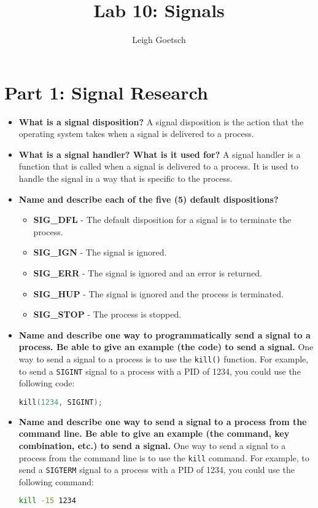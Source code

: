 \documentclass{assignment}
\author{Leigh Goetsch}
\title{Lab 10: Signals}
\begin{document}
\maketitle

\newpage


\section{Part 1: Signal Research}

\begin{itemize}
    \item \textbf{What is a signal disposition?} A signal disposition is the action that the operating system takes when a signal is delivered to a process.
    \item \textbf{What is a signal handler? What is it used for?} A signal handler is a function that is called when a signal is delivered to a process. It is used to handle the signal in a way that is specific to the process.
    \item \textbf{Name and describe each of the five (5) default dispositions?}
    \begin{itemize}
        \item \textbf{SIG\_DFL} - The default disposition for a signal is to terminate the process.
        \item \textbf{SIG\_IGN} - The signal is ignored.
        \item \textbf{SIG\_ERR} - The signal is ignored and an error is returned.
        \item \textbf{SIG\_HUP} - The signal is ignored and the process is terminated.
        \item \textbf{SIG\_STOP} - The process is stopped.
    \end{itemize}
    \item \textbf{Name and describe one way to programmatically send a signal to a process. Be able to give an example (the code) to send a signal.} One way to send a signal to a process is to use the \texttt{kill()} function. For example, to send a \texttt{SIGINT} signal to a process with a PID of 1234, you could use the following code:
    \begin{lstlisting}[language=C]
    kill(1234, SIGINT);
    \end{lstlisting}
    \item \textbf{Name and describe one way to send a signal to a process from the command line. Be able to give an example (the command, key combination, etc.) to send a signal.} One way to send a signal to a process from the command line is to use the \texttt{kill} command. For example, to send a \texttt{SIGTERM} signal to a process with a PID of 1234, you could use the following command:
    \begin{lstlisting}[language=bash]
    kill -15 1234
    \end{lstlisting}
\end{itemize}
\end{document}
